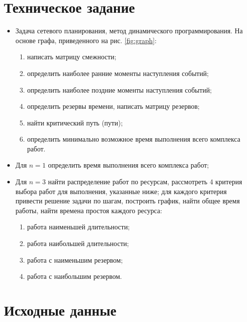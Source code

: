 





\tableofcontents
\listoftables
\listoffigures
\newpage

\section{Техническое задание}

\begin{itemize}
	\item Задача сетевого планирования, метод динамического
	программирования. На основе графа, приведенного на рис. \ref{fig:graph}:
	\begin{enumerate}
		\item написать матрицу смежности;
		\item определить наиболее ранние моменты наступления событий;
		\item определить наиболее поздние моменты наступления событий;
		\item определить резервы времени, написать матрицу резервов;
		\item найти критический путь (пути);
		\item определить минимально возможное время выполнения всего комплекса работ.
	\end{enumerate}
	\item Для $n = 1$ определить время выполнения всего комплекса работ;
	\item Для $n = 3$ найти распределение работ по ресурсам, рассмотреть 4 критерия выбора работ для выполнения, указанные ниже; для каждого критерия привести решение задачи по шагам, построить график, найти общее время работы, найти времена простоя каждого ресурса:
	\begin{enumerate}
		\item работа наименьшей длительности;
		\item работа наибольшей длительности;
		\item работа с наименьшим резервом;
		\item работа с наибольшим резервом. 
	\end{enumerate}
\end{itemize}

\vspace{-0.5cm}
\section{Исходные данные}

